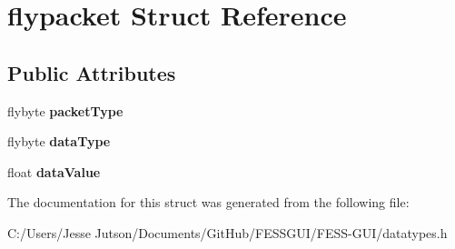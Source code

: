 \hypertarget{structflypacket}{}\section{flypacket Struct Reference}
\label{structflypacket}
\subsection*{Public Attributes}
\begin{DoxyCompactItemize}
\item 
\hypertarget{structflypacket_a1c430b5e9b74fe1822f09c23ac3ffca9}{}\label{structflypacket_a1c430b5e9b74fe1822f09c23ac3ffca9} 
flybyte {\bfseries packet\+Type}
\item 
\hypertarget{structflypacket_a9b4d29c0e457223adfedc0ce82117f49}{}\label{structflypacket_a9b4d29c0e457223adfedc0ce82117f49} 
flybyte {\bfseries data\+Type}
\item 
\hypertarget{structflypacket_a6e6310660096115b4360c9d392281463}{}\label{structflypacket_a6e6310660096115b4360c9d392281463} 
float {\bfseries data\+Value}
\end{DoxyCompactItemize}


The documentation for this struct was generated from the following file\+:\begin{DoxyCompactItemize}
\item 
C\+:/\+Users/\+Jesse Jutson/\+Documents/\+Git\+Hub/\+F\+E\+S\+S\+G\+U\+I/\+F\+E\+S\+S-\/\+G\+U\+I/datatypes.\+h\end{DoxyCompactItemize}
